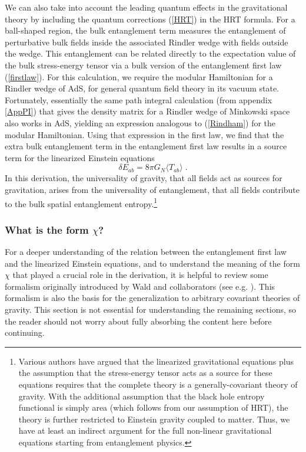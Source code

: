 \documentclass[12pt,epsf]{article}
\newcommand{\be}{\begin{equation}}
\newcommand{\ee}{\end{equation}}
\begin{document}
We can also take into account the leading quantum effects in the gravitational theory by including the quantum corrections (\ref{HRT}) in the HRT formula. For a ball-shaped region, the bulk entanglement term measures the entanglement of perturbative bulk fields inside the associated Rindler wedge with fields outside the wedge. This entanglement can be related directly to the expectation value of the bulk stress-energy tensor via a bulk version of the entanglement first law (\ref{firstlaw}). For this calculation, we require the modular Hamiltonian for a Rindler wedge of AdS, for general quantum field theory in its vacuum state. Fortunately, essentially the same path integral calculation (from appendix \ref{AppPI}) that gives the density matrix for a Rindler wedge of Minkowski space also works in AdS, yielding an expression analogous to (\ref{Rindham}) for the modular Hamiltonian. Using that expression in the first law, we find that the extra bulk entanglement term in the entanglement first law results in a source term for the linearized Einstein equations \cite{swingle2014universality}
\be
\delta E_{ab} = 8 \pi G_N \langle T_{ab} \rangle \; .
\ee
In this derivation, the universality of gravity, that all fields act as sources for gravitation, arises from the universality of entanglement, that all fields contribute to the bulk spatial entanglement entropy.\footnote{Various authors have argued that the linearized gravitational equations plus the assumption that the stress-energy tensor acts as a source for these equations requires that the complete theory is a generally-covariant theory of gravity. With the additional assumption that the black hole entropy functional is simply area (which follows from our assumption of HRT), the theory is further restricted to Einstein gravity coupled to matter. Thus, we have at least an indirect argument for the full non-linear gravitational equations starting from entanglement physics.}

\subsubsection*{What is the form $\chi$?}

For a deeper understanding of the relation between the entanglement first law and the linearized Einstein equations, and to understand the meaning of the form $\chi$ that played a crucial role in the derivation, it is helpful to review some formalism originally introduced by Wald and collaborators (see e.g. \cite{Iyer:1994ys,hollands2013stability}). This formalism is also the basis for the generalization to arbitrary covariant theories of gravity. This section is not essential for understanding the remaining sections, so the reader should not worry about fully absorbing the content here before continuing.
\end{document}
